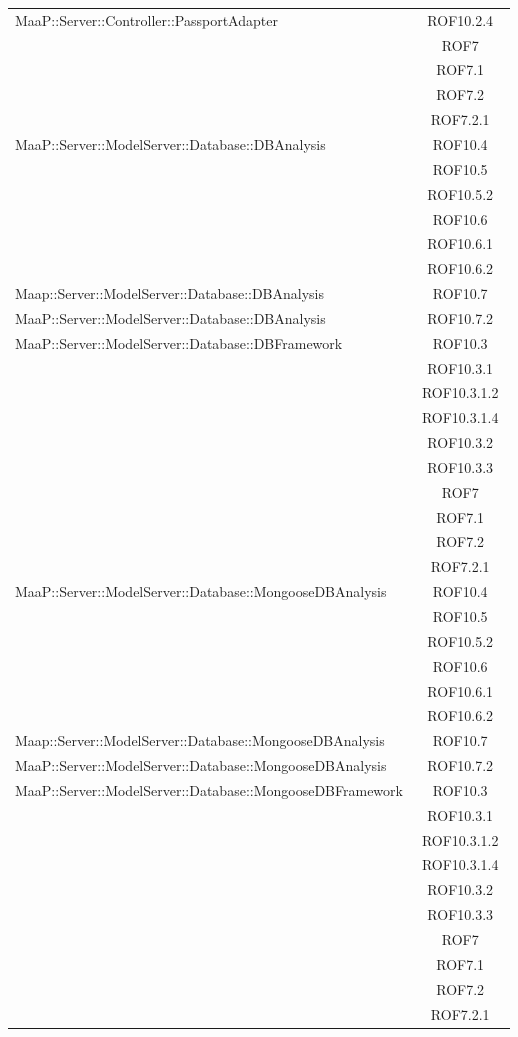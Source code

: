 \begin{center}
\begin{longtable}{|p{0.8\linewidth}|c|}
\midrule
MaaP::Server::Controller::PassportAdapter
& ROF10.2.4\\
& ROF7\\
& ROF7.1\\
& ROF7.2\\
& ROF7.2.1\\

\midrule
MaaP::Server::ModelServer::Database::DBAnalysis
& ROF10.4\\
& ROF10.5\\
& ROF10.5.2\\
& ROF10.6\\
& ROF10.6.1\\
& ROF10.6.2\\

\midrule
Maap::Server::ModelServer::Database::DBAnalysis
& ROF10.7\\

\midrule
MaaP::Server::ModelServer::Database::DBAnalysis
& ROF10.7.2\\

\midrule
MaaP::Server::ModelServer::Database::DBFramework
& ROF10.3\\
& ROF10.3.1\\
& ROF10.3.1.2\\
& ROF10.3.1.4\\
& ROF10.3.2\\
& ROF10.3.3\\
& ROF7\\
& ROF7.1\\
& ROF7.2\\
& ROF7.2.1\\

\midrule
MaaP::Server::ModelServer::Database::MongooseDBAnalysis
& ROF10.4\\
& ROF10.5\\
& ROF10.5.2\\
& ROF10.6\\
& ROF10.6.1\\
& ROF10.6.2\\

\midrule
Maap::Server::ModelServer::Database::MongooseDBAnalysis
& ROF10.7\\

\midrule
MaaP::Server::ModelServer::Database::MongooseDBAnalysis
& ROF10.7.2\\

\midrule
MaaP::Server::ModelServer::Database::MongooseDBFramework
& ROF10.3\\
& ROF10.3.1\\
& ROF10.3.1.2\\
& ROF10.3.1.4\\
& ROF10.3.2\\
& ROF10.3.3\\
& ROF7\\
& ROF7.1\\
& ROF7.2\\
& ROF7.2.1\\


\end{longtable}
\end{center}
